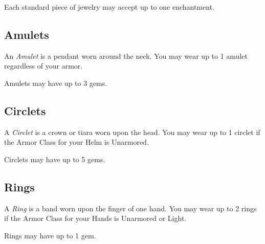 \vspace{0.4em}

Each standard piece of jewelry may accept up to one enchantment.


\subsection{Amulets}
An \textit{Amulet} is a pendant worn around the neck.
You may wear up to 1 amulet regardless of your armor.

\vspace{0.4em}

Amulets may have up to 3 gems.


\subsection{Circlets}
A \textit{Circlet} is a crown or tiara worn upon the head.
You may wear up to 1 circlet if the Armor Class for your Helm is Unarmored.

\vspace{0.4em}

Circlets may have up to 5 gems.


\subsection{Rings}
A \textit{Ring} is a band worn upon the finger of one hand.
You may wear up to 2 rings if the Armor Class for your Hands is Unarmored or Light.

\vspace{0.4em}

Rings may have up to 1 gem. 



